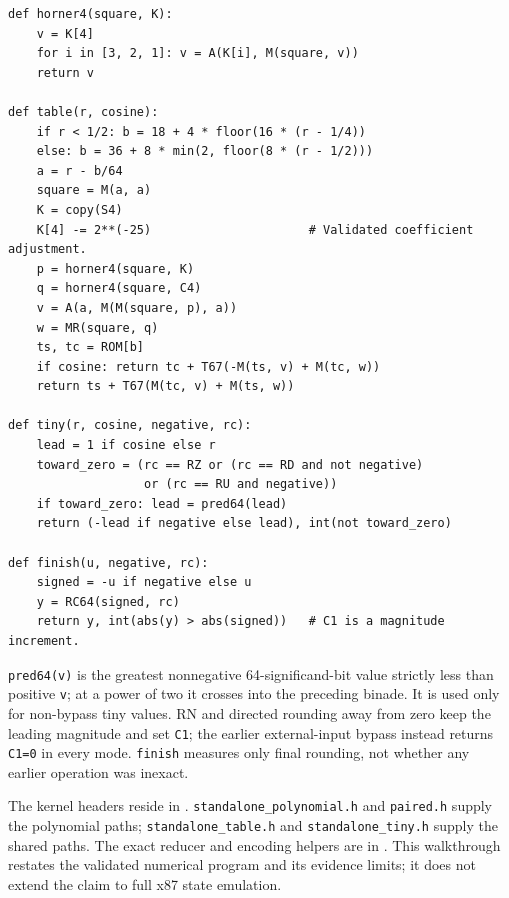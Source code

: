 \documentclass[11pt]{article}
\begin{document}
\begin{lstlisting}[style=pseudocode]
def horner4(square, K):
    v = K[4]
    for i in [3, 2, 1]: v = A(K[i], M(square, v))
    return v

def table(r, cosine):
    if r < 1/2: b = 18 + 4 * floor(16 * (r - 1/4))
    else: b = 36 + 8 * min(2, floor(8 * (r - 1/2)))
    a = r - b/64
    square = M(a, a)
    K = copy(S4)
    K[4] -= 2**(-25)                      # Validated coefficient adjustment.
    p = horner4(square, K)
    q = horner4(square, C4)
    v = A(a, M(M(square, p), a))
    w = MR(square, q)
    ts, tc = ROM[b]
    if cosine: return tc + T67(-M(ts, v) + M(tc, w))
    return ts + T67(M(tc, v) + M(ts, w))

def tiny(r, cosine, negative, rc):
    lead = 1 if cosine else r
    toward_zero = (rc == RZ or (rc == RD and not negative)
                   or (rc == RU and negative))
    if toward_zero: lead = pred64(lead)
    return (-lead if negative else lead), int(not toward_zero)

def finish(u, negative, rc):
    signed = -u if negative else u
    y = RC64(signed, rc)
    return y, int(abs(y) > abs(signed))   # C1 is a magnitude increment.
\end{lstlisting}

\noindent \texttt{pred64(v)} is the greatest nonnegative 64-significand-bit
value strictly less than positive \texttt{v}; at a power of two it crosses
into the preceding binade. It is used only for non-bypass tiny values.
RN and directed rounding away from zero keep the leading magnitude and set
\texttt{C1}; the earlier external-input bypass instead returns \texttt{C1=0}
in every mode. \texttt{finish} measures only final rounding, not whether any
earlier operation was inexact.

The kernel headers reside in .
\texttt{standalone\_polynomial.h} and \texttt{paired.h} supply the polynomial
paths; \texttt{standalone\_table.h} and \texttt{standalone\_tiny.h} supply
the shared paths. The exact reducer and encoding helpers are in
.
This walkthrough restates the validated numerical program and its evidence
limits; it does not extend the claim to full x87 state emulation.
\end{document}
